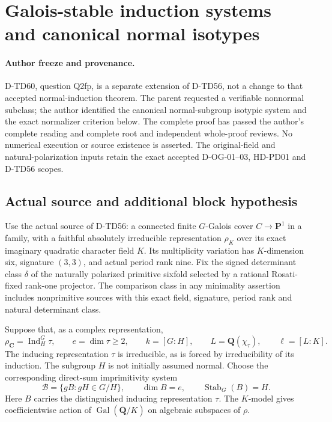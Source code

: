 \section{Galois-stable induction systems and canonical normal isotypes}
\label{sec:SF-galois-stable-normal-isotypes}

\paragraph{Author freeze and provenance.}
D-TD60, question Q2fp, is a separate extension of D-TD56,
not a change to that accepted normal-induction theorem. The parent requested a verifiable nonnormal
subclass; the author identified the canonical normal-subgroup isotypic
system and the exact normalizer criterion below. The complete proof
has passed the author's complete reading and complete root and
independent whole-proof reviews. No numerical execution or source
existence is asserted.
The original-field and natural-polarization inputs retain the exact
accepted D-OG-01--03, HD-PD01 and D-TD56 scopes.

\subsection*{Actual source and additional block hypothesis}

Use the actual source of D-TD56: a connected finite
\(G\)-Galois cover \(C\to\mathbf P^1\) in a family, with a faithful
absolutely irreducible representation \(\rho_K\) over its exact
imaginary quadratic character field \(K\). Its multiplicity variation
has \(K\)-dimension six, signature \((3,3)\), and actual period
rank nine. Fix the signed determinant class \(\delta\) of the
naturally polarized primitive sixfold selected by a rational
Rosati-fixed rank-one projector. The comparison class in any
minimality assertion includes nonprimitive sources with this exact
field, signature, period rank and natural determinant class.

Suppose that, as a complex representation,
\[
 \rho_{\mathbf C}=\operatorname{Ind}_H^G\tau,
 \qquad e=\dim\tau\ge2,
 \qquad k=[G:H],\qquad L=\mathbf Q(\chi_\tau),
 \qquad \ell=[L:K].
 \tag{GSB.1}
\]
The inducing representation \(\tau\) is irreducible, as is forced by
irreducibility of its induction. The subgroup \(H\) is not initially
assumed normal. Choose the corresponding direct-sum imprimitivity system
\[
 \mathcal B=\{gB:gH\in G/H\},
 \qquad \dim B=e,\qquad\operatorname{Stab}_G(B)=H.
 \tag{GSB.2}
\]
Here \(B\) carries the distinguished inducing representation
\(\tau\). The \(K\)-model gives coefficientwise action of
\(\operatorname{Gal}(\overline{\mathbf Q}/K)\) on algebraic
subspaces of \(\rho\).

